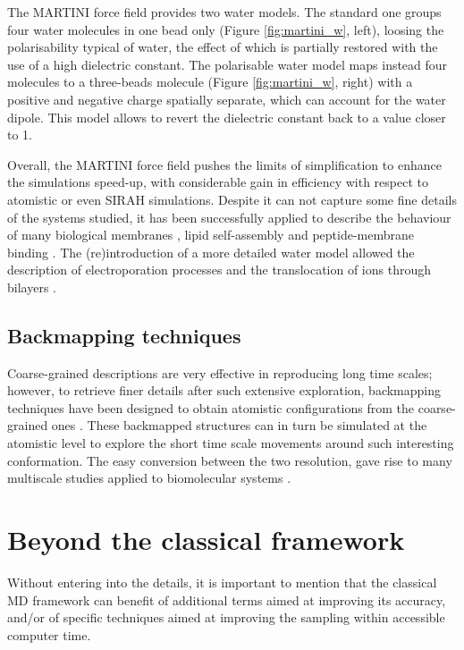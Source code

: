 The MARTINI force field provides two water models. The standard one groups four water molecules in one bead only (Figure \ref{fig:martini_w}, left), loosing the polarisability typical of water, the effect of which is partially restored with the use of a high dielectric constant. The polarisable water model \citep{Yesylevskyy2010} maps instead four molecules to a three-beads molecule (Figure \ref{fig:martini_w}, right) with a positive and negative charge spatially separate, which can account for the water dipole. This model allows to revert the dielectric constant back to a value closer to 1.

Overall, the MARTINI force field pushes the limits of simplification to enhance the simulations speed-up, with considerable gain in efficiency with respect to atomistic or even SIRAH simulations. Despite it can not capture some fine details of the systems studied, it has been successfully applied to describe the behaviour of many biological membranes \citep{Khalid2019,Samsudin2017}, lipid self-assembly \citep{Marrink2007} and peptide-membrane binding \citep{Song2019}. The (re)introduction of a more detailed water model allowed the description of electroporation processes and the translocation of ions through bilayers \citep{Yesylevskyy2010}.

\subsection{Backmapping techniques} Coarse-grained descriptions are very effective in reproducing long time scales; however, to retrieve finer details after such extensive exploration, backmapping techniques have been designed to obtain atomistic configurations from the coarse-grained ones \citep{Wassenaar2015}. These backmapped structures can in turn be simulated at the atomistic level to explore the short time scale movements around such interesting conformation. The easy conversion between the two resolution, gave rise to many multiscale studies applied to biomolecular systems \citep{Lee2012}.


\section{Beyond the classical framework}

Without entering into the details, it is important to mention that the classical MD framework can benefit of additional terms aimed at improving its accuracy, and/or of specific techniques aimed at improving the
 sampling within accessible computer time.
 
